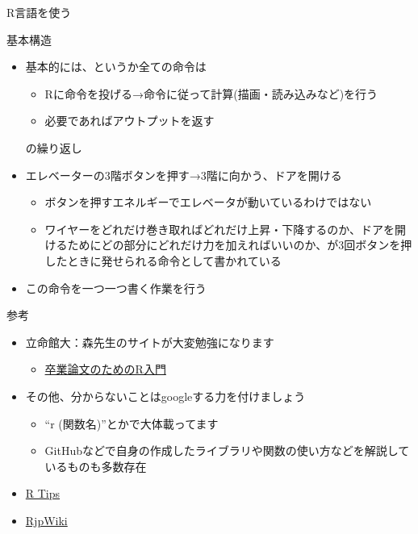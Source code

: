 \documentclass[
  ignorenonframetext,
]{beamer}
\providecommand{\tightlist}{%
  \setlength{\itemsep}{0pt}\setlength{\parskip}{0pt}}
\begin{document}
\begin{frame}[fragile]{R言語を使う}
\begin{block}{基本構造}
\protect\hypertarget{ux57faux672cux69cbux9020}{}
\begin{itemize}
\item
  基本的には、というか全ての命令は

  \begin{itemize}
  \item
    Rに命令を投げる→命令に従って計算(描画・読み込みなど)を行う
  \item
    必要であればアウトプットを返す
  \end{itemize}

  の繰り返し
\item
  エレベーターの3階ボタンを押す→3階に向かう、ドアを開ける

  \begin{itemize}
  \tightlist
  \item
    ボタンを押すエネルギーでエレベータが動いているわけではない
  \item
    ワイヤーをどれだけ巻き取ればどれだけ上昇・下降するのか、ドアを開けるためにどの部分にどれだけ力を加えればいいのか、が3回ボタンを押したときに発せられる命令として書かれている
  \end{itemize}
\item
  この命令を一つ一つ書く作業を行う
\end{itemize}
\end{block}

\begin{block}{参考}
\protect\hypertarget{ux53c2ux8003}{}
\begin{itemize}
\tightlist
\item
  立命館大：森先生のサイトが大変勉強になります

  \begin{itemize}
  \tightlist
  \item
    \href{https://tomoecon.github.io/R_for_graduate_thesis/}{卒業論文のためのR入門}
  \end{itemize}
\item
  その他、分からないことはgoogleする力を付けましょう

  \begin{itemize}
  \tightlist
  \item
    ``r (関数名)''とかで大体載ってます
  \item
    GitHubなどで自身の作成したライブラリや関数の使い方などを解説しているものも多数存在
  \end{itemize}
\item
  \href{http://cse.naro.affrc.go.jp/takezawa/r-tips/r.html}{R Tips}
\item
  \href{http://www.okadajp.org/RWiki/}{RjpWiki}
\end{itemize}
\end{block}


\end{frame}
\end{document}

